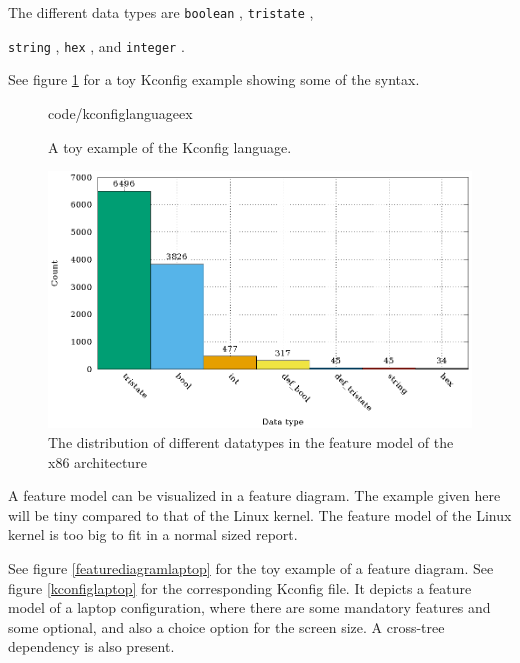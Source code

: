 \documentclass[a4paper,11pt]{report}
\newcommand{\textcode}[1]{
    \fboxsep=1pt
    \texttt{\colorbox{gray!20}{#1}}
}
\newcommand{\figa}{
    \begin{figure}[!htpb]
    \centering
}
\newcommand{\figb}[2]{
    \caption{#1}
    \label{#2}
    \end{figure}
}
\begin{document}
The different data types are \textcode{boolean}, \textcode{tristate}, 
\textcode{string}, \textcode{hex}, and \textcode{integer}.

See figure \ref{kconfiglanguageex} for a toy Kconfig example showing some of the 
syntax.

\figa
     
        {code/kconfiglanguageex}
\figb{A toy example of the Kconfig language.}{kconfiglanguageex}


%     

%     

\figa
    \includegraphics{plots/datatypestats.eps}
\figb{The distribution of different datatypes in the feature 
    model of the x86 architecture}{datatypesdistribution}

A feature model can be visualized in a feature diagram. The example given here 
will be tiny compared to that of the Linux kernel. The feature model of the 
Linux kernel is too big to fit in a normal sized report.

See figure \ref{featurediagramlaptop} for the toy example of a feature 
diagram. See figure \ref{kconfiglaptop} for the corresponding Kconfig file. It 
depicts a feature model of a laptop configuration, where there are some 
mandatory features and some optional, and also a choice option for the screen 
size. A cross-tree dependency is also present.
\end{document}
